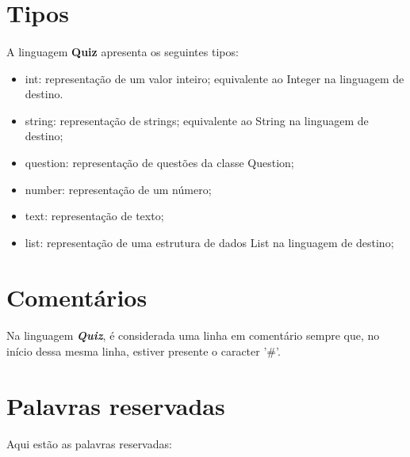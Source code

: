 \documentclass{report}
\begin{document}
\section{Tipos}

\paragraph{}

A linguagem \textbf{Quiz} apresenta os seguintes tipos: 

\begin{itemize}
	\item int: representação de um valor inteiro; equivalente ao Integer na linguagem de destino.
	\item string: representação de strings; equivalente ao String na linguagem de destino;
	\item question: representação de questões da classe Question;
	\item number: representação de um número;
	\item text: representação de texto;
	\item list: representação de uma estrutura de dados List na linguagem de destino;
\end{itemize}



\section{Comentários}

\paragraph{}

Na linguagem \textbf{\textit{Quiz}}, é considerada uma linha em comentário sempre que, no início dessa mesma linha, estiver presente o caracter '\#'.


\section{Palavras reservadas}

\paragraph{}

Aqui estão as palavras reservadas:
\end{document}
